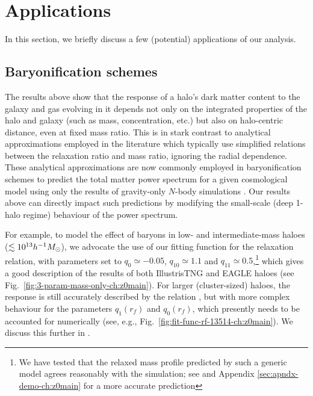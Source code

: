 \section{Applications}
\label{sec:applic-ch:z0main}
In this section, we briefly discuss a few (potential) applications of our analysis.

\subsection{Baryonification schemes}

The results above show that the response of a halo's dark matter content to the galaxy and gas evolving in it depends not only on the integrated properties of the halo and galaxy (such as mass, concentration, etc.) but also on halo-centric distance, even at fixed mass ratio. This is in stark contrast to analytical approximations employed in the literature which typically use simplified  relations between the relaxation ratio and mass ratio, ignoring the radial dependence. These analytical approximations are now commonly employed in baryonification schemes to predict the total matter power spectrum for a given cosmological model using only the results of gravity-only $N$-body simulations \citep{2015JCAP...12..049S,2018MNRAS.480.3962C,2021MNRAS.503.3596A}. Our results above can directly impact such predictions by modifying the small-scale (deep 1-halo regime) behaviour of the power spectrum. 

For example, to model the effect of baryons in low- and intermediate-mass haloes ($\lesssim10^{13}h^{-1}M_{\odot}$), we advocate the use of our fitting function  for the relaxation relation, with parameters set to $q_0\simeq-0.05$, $q_{10}\simeq1.1$ and $q_{11}\simeq0.5$,\footnote{We have tested that the relaxed mass profile predicted by such a generic model agrees reasonably with the simulation; see  and Appendix \ref{sec:apndx-demo-ch:z0main} for a more accurate prediction} which gives a good description of the results of both IllustrisTNG and EAGLE haloes (see Fig.~\ref{fig:3-param-mass-only-ch:z0main}). For larger (cluster-sized) haloes, the response is still accurately described by the relation , but with more complex behaviour for the parameters $q_1(r_f)$ and $q_0(r_f)$, which presently needs to be accounted for numerically (see, e.g., Fig.~\ref{fig:fit-func-rf-13514-ch:z0main}). We discuss this further in .




